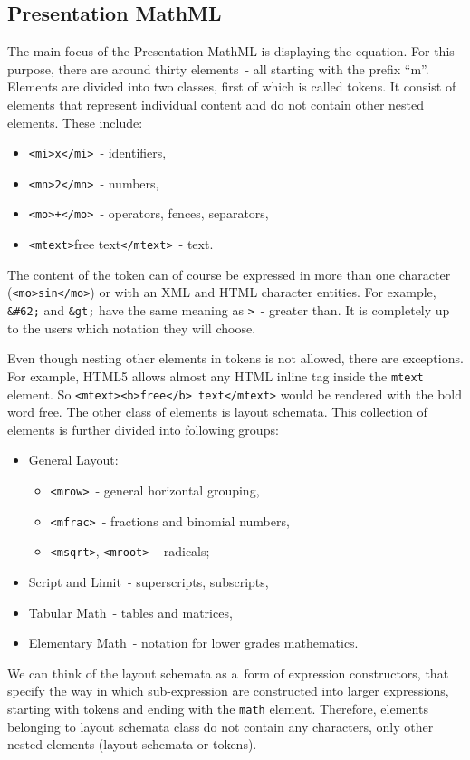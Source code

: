 \documentclass[11pt,oneside,final]{fithesis2}
\def\s#1{#1\index{#1}}
\begin{document}
\subsection{Presentation MathML}
The main focus of the \s{Presentation MathML} is displaying the equation. For this purpose, there are around thirty elements~- all starting with the prefix “m”. Elements are divided into two classes, first of which is called tokens. It consist of elements that represent individual content and do not contain other nested elements. These include: 
\begin{itemize}
\item \texttt{<mi>x</mi>}~- identifiers,
\item \texttt{<mn>2</mn>}~- numbers,
\item \texttt{<mo>+</mo>}~- operators, fences, separators,
\item \texttt{<mtext>}free text\texttt{</mtext>}~- text.
\end{itemize}
The content of the token can of course be expressed in more than one character (\texttt{<mo>sin</mo>}) or with an XML and HTML character entities. For example, \texttt{\&\#62;} and \texttt{\&gt;} have the same meaning as \texttt{>}~- greater than. It is completely up to the users which notation they will choose.

Even though nesting other elements in tokens is not allowed, there are exceptions. For example, HTML5 allows almost any HTML inline tag inside the \texttt{mtext} element. So \texttt{<mtext><b>free</b> text</mtext>} would be rendered with the bold word free.
The other class of elements is layout schemata. This collection of elements is further divided into following groups:
\begin{itemize}
\item General Layout:
	\begin{itemize}
	\item \texttt{<mrow>}~- general horizontal grouping,
	\item \texttt{<mfrac>}~- fractions and binomial numbers,
	\item \texttt{<msqrt>}, \texttt{<mroot>}~- radicals;
	\end{itemize}
\item Script and Limit~- superscripts, subscripts, 
\item Tabular Math~- tables and matrices,
\item Elementary Math~- notation for lower grades mathematics.
\end{itemize}
We can think of the layout schemata as a~form of expression constructors, that specify the way in which sub-expression are constructed into larger expressions, starting with tokens and ending with the \texttt{math} element. Therefore, elements belonging to layout schemata class do not contain any characters, only other nested elements (layout schemata or tokens). 
\end{document}
